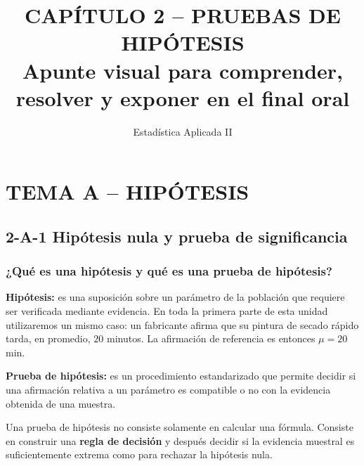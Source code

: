 \documentclass[11pt,a4paper]{article}
\title{\vspace{-1.2cm}\textbf{CAPÍTULO 2 -- PRUEBAS DE HIPÓTESIS}\\[4pt]
\large Apunte visual para comprender, resolver y exponer en el final oral}
\author{Estadística Aplicada II}
\date{}
\begin{document}
\maketitle
\tableofcontents
\newpage

\section{TEMA A -- HIPÓTESIS}
\subsection{2-A-1 Hipótesis nula y prueba de significancia}
\subsubsection{¿Qué es una hipótesis y qué es una prueba de hipótesis?}

\textbf{Hipótesis:} es una suposición sobre un parámetro de la población que requiere ser verificada mediante evidencia. En toda la primera parte de esta unidad utilizaremos un mismo caso: un fabricante afirma que su pintura de secado rápido tarda, en promedio, $20$ minutos. La afirmación de referencia es entonces $\mu=20$ min.

\textbf{Prueba de hipótesis:} es un procedimiento estandarizado que permite decidir si una afirmación relativa a un parámetro es compatible o no con la evidencia obtenida de una muestra.

\begin{ideaclave}
Una prueba de hipótesis no consiste solamente en calcular una fórmula. Consiste en construir una \textbf{regla de decisión} y después decidir si la evidencia muestral es suficientemente extrema como para rechazar la hipótesis nula.
\end{ideaclave}

\begin{center}
\end{center}
\end{document}
